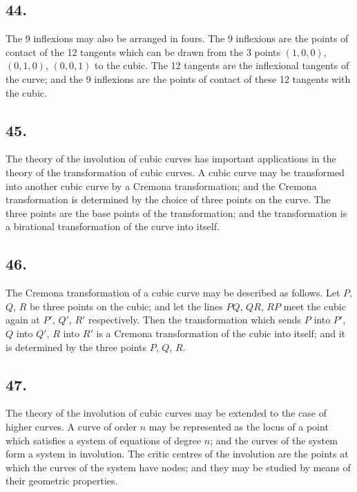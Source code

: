 \documentclass[11pt,a4paper]{article}
\theoremstyle{definition}
\begin{document}
\subsection*{44.}

The 9 inflexions may also be arranged in fours. The 9 inflexions are the points of
contact of the 12 tangents which can be drawn from the 3 points $(1, 0, 0)$, $(0, 1, 0)$,
$(0, 0, 1)$ to the cubic. The 12 tangents are the inflexional tangents of the curve; and the
9 inflexions are the points of contact of these 12 tangents with the cubic.

\newpage
\subsection*{45.}

The theory of the involution of cubic curves has important applications in the theory
of the transformation of cubic curves. A cubic curve may be transformed into another
cubic curve by a Cremona transformation; and the Cremona transformation is determined
by the choice of three points on the curve. The three points are the base points of the
transformation; and the transformation is a birational transformation of the curve into itself.

\subsection*{46.}

The Cremona transformation of a cubic curve may be described as follows. Let $P$,
$Q$, $R$ be three points on the cubic; and let the lines $PQ$, $QR$, $RP$ meet the cubic again at
$P'$, $Q'$, $R'$ respectively. Then the transformation which sends $P$ into $P'$, $Q$ into $Q'$, $R$ into
$R'$ is a Cremona transformation of the cubic into itself; and it is determined by the three
points $P$, $Q$, $R$.

\newpage
\subsection*{47.}

The theory of the involution of cubic curves may be extended to the case of higher
curves. A curve of order $n$ may be represented as the locus of a point which satisfies a
system of equations of degree $n$; and the curves of the system form a system in involution.
The critic centres of the involution are the points at which the curves of the system have
nodes; and they may be studied by means of their geometric properties.
\end{document}
